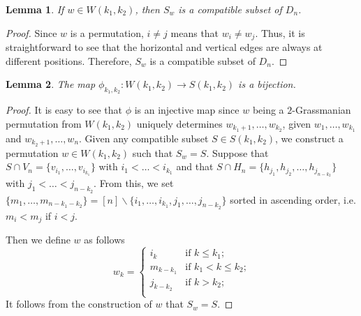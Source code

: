 \documentclass{amsart}
\newtheorem{lma}{Lemma}
\begin{document}



  \begin{lma}
    \label{lma:mapCompat}
    If $w\in W(k_1,k_2)$, then $S_w$ is a compatible subset of $D_n$.
  \end{lma}
  \begin{proof}
    Since $w$ is a permutation, $i\neq j$ means that $w_i\neq w_j$.
    Thus, it is straightforward to see that the horizontal and vertical edges are always at different positions.
    Therefore, $S_w$ is a compatible subset of $D_n$.
  \end{proof}

  \begin{lma}
    \label{lma:bij}
    The map $\phi_{k_1,k_2}:W(k_1,k_2)\to S(k_1,k_2)$ is a bijection.
  \end{lma}
  \begin{proof}
    It is easy to see that $\phi$ is an injective map since $w$ being a $2$-Grassmanian permutation from $W(k_1,k_2)$ uniquely determines $w_{k_1+1},\ldots,w_{k_2}$, given $w_{1},\ldots,w_{k_1}$ and $w_{k_2+1},\ldots,w_{n}$.
    Given any compatible subset $S\in S(k_1,k_2)$, we construct a permutation $w\in W(k_1,k_2)$ such that $S_w=S$.
    Suppose that $S\cap V_n = \{v_{i_1},\ldots,v_{i_{k_1}} \}$ with $i_1<\ldots<i_{k_1}$ and that $S\cap H_n=\{ h_{j_1},h_{j_2},\ldots, h_{j_{n-k_2}} \}$ with $j_1<\ldots<j_{n-k_2}$.
    From this, we set $\{m_1, \ldots,m_{n-k_1-k_2}\} = [n]\backslash \{i_1,\ldots,i_{k_1},j_1,\ldots,j_{n-k_2} \}$ sorted in ascending order, i.e. $m_i<m_j$ if $i<j$.

    Then we define $w$ as follows
    \[
      w_k= 
      \begin{cases}
        i_k & \text{if $k\leq k_1$};\\
        m_{k-k_1} & \text{if $k_1< k \leq k_2 $;}\\
        j_{k-k_2} & \text{if $k > k_2 $;}\\
      \end{cases}
    \]
    It follows from the construction of $w$ that $S_{w}=S$.
  \end{proof}
\end{document}
